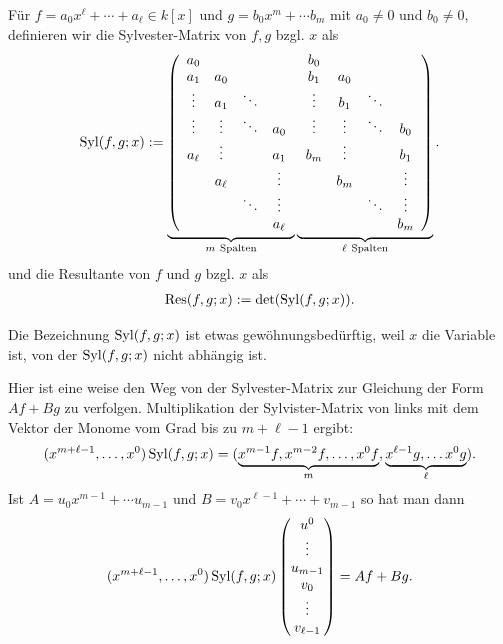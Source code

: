 \documentclass[11pt]{article}
\numberwithin{equation}{section}
\begin{document}
\begin{definition} 
	Für $f = a_0 x^\ell + \cdots + a_\ell \in k[x]$ und $g = b_0 x^m + \cdots b_m$ mit $a_0 \ne 0$ und $b_0 \ne 0$, definieren wir die Sylvester-Matrix von $f,g$ bzgl. $x$ als 
	\begin{align*}
			\operatorname{Syl}(f,g;x):=
			\underbrace{
			\left(
			\begin{array}{cccc}
				a_0 &  &  &  \\
				a_1 & a_0 &  &  \\
				\vdots & a_1 & \ddots &  \\
				\vdots & \vdots & \ddots & a_0 \\
				a_\ell & \vdots &  & a_1 \\
				& a_\ell &  & \vdots \\
				&  & \ddots & \vdots \\
				&  &  & a_\ell
			\end{array}\right.}_{m \ \text{Spalten}}
				\underbrace{\left.
		\begin{array}{cccc}
			b_0 &  &  &  \\
			b_1 & a_0 &  &  \\
			\vdots & b_1 & \ddots &  \\
			\vdots & \vdots & \ddots & b_0 \\
			b_m & \vdots &  & b_1 \\
			& b_m &  & \vdots \\
			&  & \ddots & \vdots \\
			&  &  & b_m
	\end{array}\right)}_{\ell \ \text{Spalten}}.
	\end{align*} 
und die Resultante von $f$ und $g$ bzgl. $x$ als 
\begin{align*}
		\operatorname{Res}(f,g;x) := \det(\operatorname{Syl}(f,g;x)). 
\end{align*} 
\end{definition} 

\begin{remark} 
	Die Bezeichnung $\operatorname{Syl}(f,g;x)$ ist etwas gewöhnungsbedürftig, weil $x$ die Variable ist, von der $\operatorname{Syl}(f,g;x)$ nicht abhängig ist. 
\end{remark} 

\begin{remark} 
	Hier ist eine weise den Weg von der Sylvester-Matrix zur Gleichung der Form $A f + B g$ zu verfolgen. Multiplikation der Sylvister-Matrix von links mit dem Vektor der Monome vom Grad bis zu $m+ \ell-1$ ergibt: 
	\[
		(x^{m+\ell-1},\ldots, x^0) \operatorname{Syl}(f,g;x) = (\underbrace{x^{m-1} f, x^{m-2} f,\ldots, x^0 f}_{m}, \underbrace{x^{\ell-1} g, \ldots x^0 g}_{\ell} ). 
	\]
	Ist $A  = u_0 x^{m-1} + \cdots u_{m-1}$ und $B = v_0 x^{\ell-1} + \cdots + v_{m-1}$ so hat man dann 
	\[
		(x^{m+\ell-1},\ldots, x^0) \operatorname{Syl}(f,g;x) \begin{pmatrix} u^0 \\ \vdots \\ u_{m-1} \\ v_0 \\ \vdots \\ v_{\ell-1} \end{pmatrix}  = A f + B g. 
	\]
\end{remark} 
\end{document}
